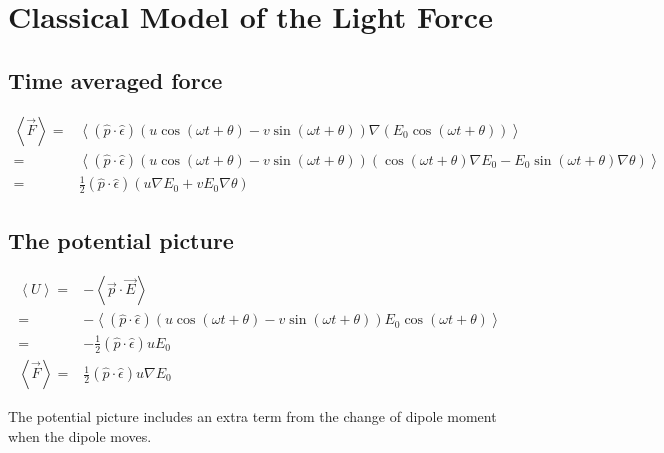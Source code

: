 \documentclass[10pt,fleqn]{article}
\newcommand{\eqar}[1]
{
  \begin{align*}
    #1
  \end{align*}
}
\newcommand{\paren}[1]{{\left({#1}\right)}}
\newcommand{\angl}[1]{{\left\langle{#1}\right\rangle}}
\begin{document}
\section{Classical Model of the Light Force}
\subsection{Time averaged force}
\eqar{
  \angl{\vec F}=&\angl{\paren{\hat p\cdot\hat\epsilon}\paren{u\cos\paren{\omega t+\theta}-v\sin\paren{\omega t+\theta}}\nabla\paren{E_0\cos\paren{\omega t+\theta}}}\\
  =&\angl{\paren{\hat p\cdot\hat\epsilon}\paren{u\cos\paren{\omega t+\theta}-v\sin\paren{\omega t+\theta}}\paren{\cos\paren{\omega t+\theta}\nabla E_0-E_0\sin\paren{\omega t+\theta}\nabla\theta}}\\
  =&\frac12\paren{\hat p\cdot\hat\epsilon}\paren{u\nabla E_0+vE_0\nabla\theta}
}
\subsection{The potential picture}
\eqar{
  \angl{U}=&-\angl{\vec p\cdot\vec E}\\
  =&-\angl{\paren{\hat p\cdot\hat\epsilon}\paren{u\cos\paren{\omega t+\theta}-v\sin\paren{\omega t+\theta}}E_0\cos\paren{\omega t+\theta}}\\
  =&-\frac12\paren{\hat p\cdot\hat\epsilon}uE_0\\
  \angl{\vec F}=&\frac12\paren{\hat p\cdot\hat\epsilon}u\nabla E_0
}
The potential picture includes an extra term from the change of dipole moment when the dipole moves.
\end{document}
